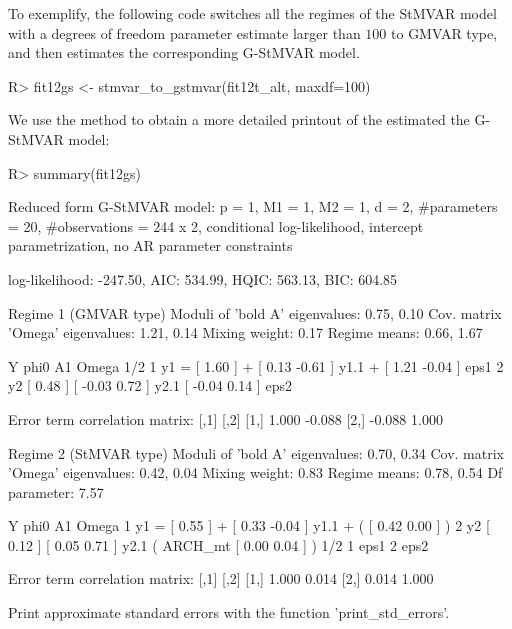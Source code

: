 \documentclass[nojss]{jss} %
\begin{document}
To exemplify, the following code switches all the regimes of the StMVAR model  with a degrees of freedom parameter estimate larger than $100$ to GMVAR type, and then estimates the corresponding G-StMVAR model.
%
\begin{Schunk}
\begin{Sinput}
R> fit12gs <- stmvar_to_gstmvar(fit12t_alt, maxdf=100)
\end{Sinput}
\end{Schunk}
%
We use the  method to obtain a more detailed printout of the estimated the G-StMVAR model:
%
\begin{Schunk}
\begin{Sinput}
R> summary(fit12gs)
\end{Sinput}
\begin{Soutput}
Reduced form G-StMVAR model:
 p = 1, M1 = 1, M2 = 1, d = 2, #parameters = 20, #observations = 244 x 2,
 conditional log-likelihood, intercept parametrization, no AR parameter constraints 

 log-likelihood: -247.50, AIC: 534.99, HQIC: 563.13, BIC: 604.85 

Regime 1 (GMVAR type)
Moduli of 'bold A' eigenvalues:  0.75, 0.10 
Cov. matrix 'Omega' eigenvalues: 1.21, 0.14 
Mixing weight: 0.17 
Regime means: 0.66, 1.67

   Y     phi0          A1                  Omega         1/2     
1 y1 = [ 1.60 ] + [  0.13 -0.61 ] y1.1 + [  1.21 -0.04 ]     eps1
2 y2   [ 0.48 ]   [ -0.03  0.72 ] y2.1   [ -0.04  0.14 ]     eps2

Error term correlation matrix:
       [,1]   [,2]
[1,]  1.000 -0.088
[2,] -0.088  1.000

Regime 2 (StMVAR type)
Moduli of 'bold A' eigenvalues:  0.70, 0.34 
Cov. matrix 'Omega' eigenvalues: 0.42, 0.04 
Mixing weight: 0.83 
Regime means: 0.78, 0.54
Df parameter:  7.57

   Y     phi0          A1                            Omega         
1 y1 = [ 0.55 ] + [  0.33 -0.04 ] y1.1 + (         [  0.42 0.00 ] )
2 y2   [ 0.12 ]   [  0.05  0.71 ] y2.1   ( ARCH_mt [  0.00 0.04 ] )
  1/2     
1     eps1
2     eps2

Error term correlation matrix:
      [,1]  [,2]
[1,] 1.000 0.014
[2,] 0.014 1.000

Print approximate standard errors with the function 'print_std_errors'.
\end{Soutput}
\end{Schunk}
%
\end{document}
